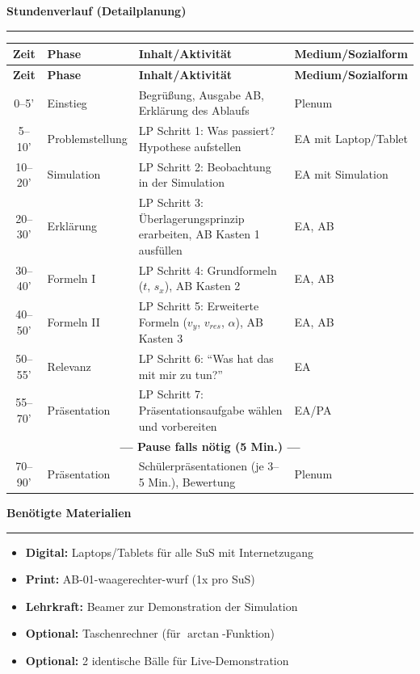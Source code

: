 \documentclass[11pt, a4paper]{article}
\newcommand{\fachfarbe}{physik}
\newcommand{\abschnitt}[1]{%
    \vspace{12pt}
    \noindent\textbf{\large\textcolor{\fachfarbe}{#1}}
    \vspace{6pt}
    \hrule
    \vspace{8pt}
}
\begin{document}

\abschnitt{Stundenverlauf (Detailplanung)}

\renewcommand{\arraystretch}{1.3}
\begin{longtable}{|c|p{3.5cm}|p{6cm}|p{3cm}|}
\hline
\textbf{Zeit} & \textbf{Phase} & \textbf{Inhalt/Aktivität} & \textbf{Medium/Sozialform} \\
\hline
\endfirsthead
\hline
\textbf{Zeit} & \textbf{Phase} & \textbf{Inhalt/Aktivität} & \textbf{Medium/Sozialform} \\
\hline
\endhead
\hline
\endfoot

0--5' & Einstieg & Begrüßung, Ausgabe AB, Erklärung des Ablaufs & Plenum \\
\hline
5--10' & Problemstellung & LP Schritt 1: Was passiert? Hypothese aufstellen & EA mit Laptop/Tablet \\
\hline
10--20' & Simulation & LP Schritt 2: Beobachtung in der Simulation & EA mit Simulation \\
\hline
20--30' & Erklärung & LP Schritt 3: Überlagerungsprinzip erarbeiten, AB Kasten 1 ausfüllen & EA, AB \\
\hline
30--40' & Formeln I & LP Schritt 4: Grundformeln ($t$, $s_x$), AB Kasten 2 & EA, AB \\
\hline
40--50' & Formeln II & LP Schritt 5: Erweiterte Formeln ($v_y$, $v_{res}$, $\alpha$), AB Kasten 3 & EA, AB \\
\hline
50--55' & Relevanz & LP Schritt 6: ``Was hat das mit mir zu tun?'' & EA \\
\hline
55--70' & Präsentation & LP Schritt 7: Präsentationsaufgabe wählen und vorbereiten & EA/PA \\
\hline
\multicolumn{4}{|c|}{\textbf{--- Pause falls nötig (5 Min.) ---}} \\
\hline
70--90' & Präsentation & Schülerpräsentationen (je 3--5 Min.), Bewertung & Plenum \\
\hline
\end{longtable}


\abschnitt{Benötigte Materialien}

\begin{itemize}
    \item \textbf{Digital:} Laptops/Tablets für alle SuS mit Internetzugang
    \item \textbf{Print:} AB-01-waagerechter-wurf (1x pro SuS)
    \item \textbf{Lehrkraft:} Beamer zur Demonstration der Simulation
    \item \textbf{Optional:} Taschenrechner (für $\arctan$-Funktion)
    \item \textbf{Optional:} 2 identische Bälle für Live-Demonstration
\end{itemize}
\end{document}
